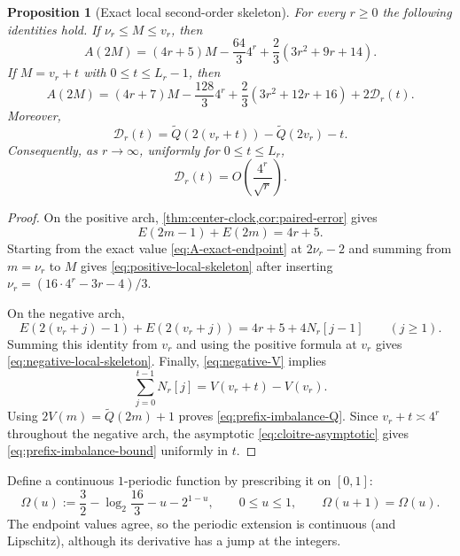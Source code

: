 \documentclass[11pt]{article}
\newtheorem{proposition}[theorem]{Proposition}
\theoremstyle{definition}
\theoremstyle{remark}
\newcommand{\Qp}{\widetilde Q}
\begin{document}
\begin{proposition}[Exact local second-order skeleton]
\label{prop:exact-local-skeleton}
For every $r\ge0$ the following identities hold.
If $\nu_r\le M\le v_r$, then
\begin{equation}
{
A(2M)
=(4r+5)M-\frac{64}{3}4^r
+\frac{2}{3}(3r^2+9r+14).
}
\label{eq:positive-local-skeleton}
\end{equation}
If $M=v_r+t$ with $0\le t\le L_r-1$, then
\begin{equation}
{
A(2M)
=(4r+7)M-\frac{128}{3}4^r
+\frac{2}{3}(3r^2+12r+16)
+2\mathscr D_r(t).
}
\label{eq:negative-local-skeleton}
\end{equation}
Moreover,
\begin{equation}
{
\mathscr D_r(t)
=\Qp\!\left(2(v_r+t)\right)-\Qp(2v_r)-t.
}
\label{eq:prefix-imbalance-Q}
\end{equation}
Consequently, as $r\to\infty$, uniformly for $0\le t\le L_r$,
\begin{equation}
\mathscr D_r(t)
=O\!\left(\frac{4^r}{\sqrt r}\right).
\label{eq:prefix-imbalance-bound}
\end{equation}
\end{proposition}

\begin{proof}
On the positive arch, \cref{thm:center-clock,cor:paired-error} gives
\[
E(2m-1)+E(2m)=4r+5.
\]
Starting from the exact value \eqref{eq:A-exact-endpoint} at
$2\nu_r-2$ and summing from $m=\nu_r$ to $M$ gives
\eqref{eq:positive-local-skeleton} after inserting
$\nu_r=(16\cdot4^r-3r-4)/3$.

On the negative arch,
\[
E(2(v_r+j)-1)+E(2(v_r+j))
=4r+5+4N_r[j-1]
\qquad(j\ge1).
\]
Summing this identity from $v_r$ and using the positive formula at $v_r$
gives \eqref{eq:negative-local-skeleton}.  Finally,
\eqref{eq:negative-V} implies
\[
\sum_{j=0}^{t-1}N_r[j]=V(v_r+t)-V(v_r).
\]
Using $2V(m)=\Qp(2m)+1$ proves \eqref{eq:prefix-imbalance-Q}.  Since
$v_r+t\asymp4^r$ throughout the negative arch, the asymptotic
\eqref{eq:cloitre-asymptotic} gives \eqref{eq:prefix-imbalance-bound}
uniformly in $t$.
\end{proof}

Define a continuous $1$-periodic function by prescribing it on $[0,1]$:
\begin{equation}
{
\Omega(u)
:=\frac32-\log_2\frac{16}{3}-u-2^{1-u},
\qquad 0\le u\le1,
\qquad \Omega(u+1)=\Omega(u).
}
\label{eq:Omega-def}
\end{equation}
The endpoint values agree, so the periodic extension is continuous (and
Lipschitz), although its derivative has a jump at the integers.
\end{document}
